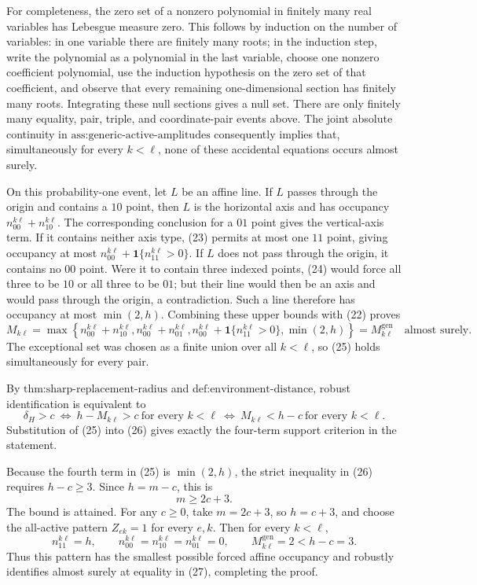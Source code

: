 For completeness, the zero set of a nonzero polynomial in finitely many real variables has Lebesgue measure zero.  This follows by induction on the number of variables: in one variable there are finitely many roots; in the induction step, write the polynomial as a polynomial in the last variable, choose one nonzero coefficient polynomial, use the induction hypothesis on the zero set of that coefficient, and observe that every remaining one-dimensional section has finitely many roots.  Integrating these null sections gives a null set.  There are only finitely many equality, pair, triple, and coordinate-pair events above.  The joint absolute continuity in \(\text{ass:generic-active-amplitudes}\) consequently implies that, simultaneously for every \(k<\ell\), none of these accidental equations occurs almost surely.

On this probability-one event, let \(L\) be an affine line.  If \(L\) passes through the origin and contains a \(10\) point, then \(L\) is the horizontal axis and has occupancy \(n_{00}^{k\ell}+n_{10}^{k\ell}\).  The corresponding conclusion for a \(01\) point gives the vertical-axis term.  If it contains neither axis type, (23) permits at most one \(11\) point, giving occupancy at most \(n_{00}^{k\ell}+\mathbf 1\{n_{11}^{k\ell}>0\}\).  If \(L\) does not pass through the origin, it contains no \(00\) point.  Were it to contain three indexed points, (24) would force all three to be \(10\) or all three to be \(01\); but their line would then be an axis and would pass through the origin, a contradiction.  Such a line therefore has occupancy at most \(\min(2,h)\).  Combining these upper bounds with (22) proves
\[
 M_{k\ell}
 =\max\!\left\{
 n_{00}^{k\ell}+n_{10}^{k\ell},
 n_{00}^{k\ell}+n_{01}^{k\ell},
 n_{00}^{k\ell}+\mathbf 1\{n_{11}^{k\ell}>0\},
 \min(2,h)
 \right\}
 =M_{k\ell}^{\mathrm{gen}}\quad\text{almost surely}. \tag{25}
\]
The exceptional set was chosen as a finite union over all \(k<\ell\), so (25) holds simultaneously for every pair.

By \(\text{thm:sharp-replacement-radius}\) and \(\text{def:environment-distance}\), robust identification is equivalent to
\[
 \delta_H>c
 \ \Longleftrightarrow\ h-M_{k\ell}>c\ \text{for every }k<\ell
 \ \Longleftrightarrow\ M_{k\ell}<h-c\ \text{for every }k<\ell. \tag{26}
\]
Substitution of (25) into (26) gives exactly the four-term support criterion in the statement.

Because the fourth term in (25) is \(\min(2,h)\), the strict inequality in (26) requires \(h-c\ge3\).  Since \(h=m-c\), this is
\[
 m\ge2c+3. \tag{27}
\]
The bound is attained.  For any \(c\ge0\), take \(m=2c+3\), so \(h=c+3\), and choose the all-active pattern \(Z_{ek}=1\) for every \(e,k\).  Then for every \(k<\ell\),
\[
 n_{11}^{k\ell}=h,\qquad
 n_{00}^{k\ell}=n_{10}^{k\ell}=n_{01}^{k\ell}=0,\qquad
 M_{k\ell}^{\mathrm{gen}}=2<h-c=3.
\]
Thus this pattern has the smallest possible forced affine occupancy and robustly identifies almost surely at equality in (27), completing the proof.